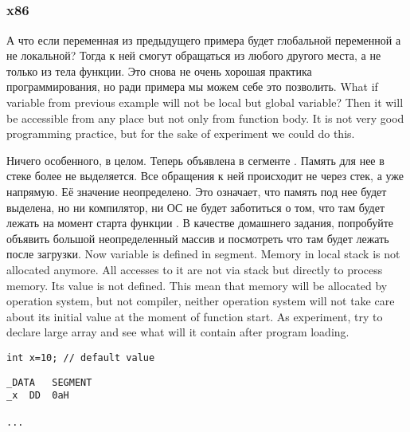 ﻿\subsection{}
\subsubsection{x86}

\IFRU
{А что если переменная  из предыдущего примера будет глобальной переменной а не локальной? 
Тогда к ней смогут обращаться из любого другого места, а не только из тела функции. 
Это снова не очень хорошая практика программирования, но ради примера мы можем себе это позволить.}
{What if  variable from previous example will not be local but global variable? 
Then it will be accessible from any place but not only from function body. 
It is not very good programming practice, but for the sake of experiment we could do this.}



\IFRU
{Ничего особенного, в целом. Теперь  объявлена в сегменте . 
Память для нее в стеке более не выделяется. Все обращения к ней происходит не через стек, а уже напрямую. 
Её значение неопределено. 
Это означает, что память под нее будет выделена, но ни компилятор, ни ОС не будет заботиться о том, 
что там будет лежать на момент старта функции \main.
В качестве домашнего задания, попробуйте объявить большой неопределенный массив и посмотреть 
что там будет лежать после загрузки.}
{Now  variable is defined in  segment. 
Memory in local stack is not allocated anymore. 
All accesses to it are not via stack but directly to process memory. 
Its value is not defined. 
This mean that memory will be allocated by operation system, but not compiler, 
neither operation system will not take care about its initial value at the moment of 
\main function start.
As experiment, try to declare large array and see what will it contain after 
program loading.}


\begin{lstlisting}
int x=10; // default value
\end{lstlisting}


\begin{lstlisting}
_DATA	SEGMENT
_x	DD	0aH

...
\end{lstlisting}

